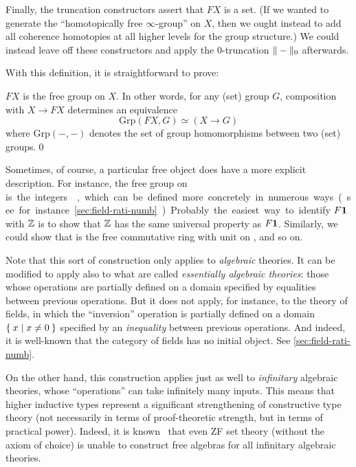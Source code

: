 Finally, the truncation constructors assert that $F X$ is a set.
(If we wanted to generate the ``homotopically free $\infty$-group'' on $X$, then we ought instead to add all coherence homotopies at all higher levels for the group structure.)
We could instead leave off these constructors and apply the 0-truncation $\trunc 0-$ afterwards.

With this definition, it is straightforward to prove:

\begin{thm}
  $F X$ is the free group on $X$.
  In other words, for any (set) group $G$, composition with $X\to F X$ determines an equivalence
  \[ \mathrm{Grp}(F X,G) \simeq (X\to G) \]
  where $\mathrm{Grp}(-,-)$ denotes the set of group homomorphisms between two (set) groups.\qed
\end{thm}

Sometimes, of course, a particular free object does have a more explicit description.
For instance, the free group on \unit is the integers \Z, which can be defined more concretely in numerous ways (see for instance \autoref{sec:field-rati-numb}).
Probably the easiest way to identify $F\unit$ with $\Z$ is to show that $\Z$ has the same universal property as $F\unit$.
Similarly, we could show that \Z is the free commutative ring with unit on \emptyt, and so on.

Note that this sort of construction only applies to \emph{algebraic} theories.
It can be modified to apply also to what are called \emph{essentially algebraic theories}: those whose operations are partially defined on a domain specified by equalities between previous operations.
But it does not apply, for instance, to the theory of fields, in which the ``inversion'' operation is partially defined on a domain $\setof{x | x\neq 0}$ specified by an \emph{inequality} between previous operations.
And indeed, it is well-known that the category of fields has no initial object.
See \autoref{sec:field-rati-numb}.

On the other hand, this construction applies just as well to \emph{infinitary} algebraic theories, whose ``operations'' can take infinitely many inputs.
This means that higher inductive types represent a significant strengthening of constructive type theory (not necessarily in terms of proof-theoretic strength, but in terms of practical power).
Indeed, it is known~\cite{blass:freealg} that even ZF set theory (without the axiom of choice) is unable to construct free algebras for all infinitary algebraic theories.


